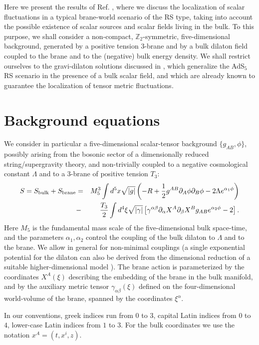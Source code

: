 \documentclass[a4paper,12pt]{article}
\begin{document}
Here we present the results of Ref. \cite{BGV}, where we discuss
the localization of scalar fluctuations in a typical
brane-world scenario of the RS type, taking into account the
possible existence of scalar sources and scalar fields living in
the bulk. To this purpose, we shall consider a non-compact,
$\mathbb{Z}_2$-symmetric, five-dimensional background, generated
by a positive tension 3-brane and by a bulk dilaton field coupled
to the brane and to the (negative) bulk energy density. We shall
restrict ourselves to the gravi-dilaton solutions discussed in
\cite{CLP}, which generalize the AdS$_5$ RS scenario in the
presence of a bulk scalar field, and which are already known to
guarantee the localization of tensor metric fluctuations.

\section{Background equations}

We consider in particular a five-dimensional scalar-tensor background
$\{g_{AB}, \phi\}$, possibly arising from the bosonic sector of a
dimensionally reduced string/supergravity theory, and
non-trivially coupled to a negative cosmological constant
$\Lambda$ and to a 3-brane of  positive tension $T_3$:
\begin{eqnarray}
 S=S_{\rm bulk}+
S_{\rm brane}&=&{M_5^3}\int d^5 x \sqrt{|g|} \left( -R+\frac{1}{2}
g^{AB}
\partial_A \phi
\partial_B \phi -2 \Lambda e^{\alpha_1 \phi}
\right) \nonumber\\ &-& \frac{T_3}{2} \int d ^4 \xi
\sqrt{|\gamma|}\left[ \gamma^{\alpha \beta} \partial_\alpha X^A
\partial_\beta
 X^B g_{AB}
e^{\alpha_2 \phi} -2 \right]. \label{21}
\end{eqnarray}
Here $M_5$ is the fundamental mass scale of the five-dimensional
bulk space-time, and the parameters $\alpha_1, \alpha_2$ control
the coupling of the bulk dilaton to $\Lambda$ and to the brane. We
allow in general for non-minimal couplings (a single exponential
potential for the dilaton can also be derived from the dimensional
reduction of a suitable higher-dimensional model \cite{CLP}). The
brane action is parameterized by the coordinates $X^A(\xi)$
describing the embedding of the brane in the bulk manifold, and by
the auxiliary metric tensor $\gamma_{\alpha \beta}(\xi)$ defined
on the four-dimensional world-volume of the brane, spanned by the
coordinates $\xi^\alpha$.

In our conventions, greek indices run from $0$ to $3$, capital
Latin indices from $0$ to $4$, lower-case Latin indices from $1$
to $3$. For the bulk coordinates we use the notation $x^A=(t,x^i,z)$.
\end{document}
